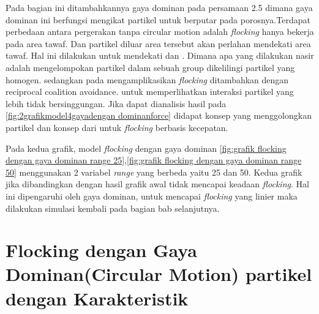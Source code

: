\hspace{0.6cm} Pada bagian ini ditambahkannya gaya dominan pada persamaan 2.5 dimana gaya dominan ini berfungsi mengikat partikel untuk berputar pada porosnya.Terdapat perbedaan antara pergerakan tanpa circular motion adalah \textit{flocking} hanya bekerja pada area tawaf. Dan partikel diluar area tersebut akan perlahan mendekati area tawaf. Hal ini dilakukan untuk mendekati \citep{Nasir2016} dan \citep{Kim2014}. Dimana apa yang dilakukan nasir adalah mengelompokan partikel dalam sebuah group dikelilingi partikel yang homogen. sedangkan pada \citep{Kim2014} mengamplikasikan \textit{flocking} ditambahkan dengan reciprocal coalition avoidance. untuk memperlihatkan interaksi partikel yang lebih tidak bersinggungan. Jika dapat dianalisis hasil pada \ref{fig:2grafikmodel4gayadengan dominanforce} didapat konsep \citep{Nasir2016} yang menggolongkan partikel dan konsep dari \citep{Kim2014} untuk \textit{flocking} berbasis kecepatan.

\hspace{0.6cm}Pada kedua grafik, model \textit{flocking} dengan gaya dominan \ref{fig:grafik flocking dengan gaya dominan range 25},\ref{fig:grafik flocking dengan gaya dominan range 50} menggunakan 2 variabel \textit{range} yang berbeda yaitu 25 dan 50. Kedua grafik jika dibandingkan dengan hasil grafik awal tidak mencapai keadaan \textit{flocking}. Hal ini dipengaruhi oleh gaya dominan, untuk mencapai \textit{flocking} yang linier maka dilakukan simulasi kembali pada bagian bab selanjutnya. 

\section{Flocking dengan Gaya Dominan(Circular Motion) partikel dengan Karakteristik}%

